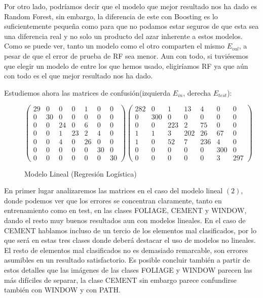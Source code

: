 \documentclass{article}
\begin{document}
	\par
	Por otro lado, podríamos decir que el modelo que mejor resultado nos ha dado es Random Forest, sin embargo, la diferencia de este con Boosting es lo suficientemente pequeña como para que no podamos estar seguros de que esta sea una diferencia real y no solo un producto del azar inherente a estos modelos. Como se puede ver, tanto un modelo como el otro comparten el mismo $E_{val}$, a pesar de que el error de prueba de RF sea menor. Aun con todo, si tuviésemos que elegir un modelo de entre los que hemos usado, eligiríamos RF ya que aún con todo es el que mejor resultado nos ha dado.
	\par
	Estudiemos ahora las matrices de confusión(izquierda $E_{in}$, derecha ${E_{test}}$):
	
	\begin{figure}[H]
	\begin{equation}
		\begin{pmatrix}
			29 & 0 & 0 & 0 & 1 & 0 & 0\\
			0 & 30 & 0 & 0 & 0 & 0 & 0\\
			0 & 0 & 24 & 0 & 6 & 0 & 0\\
			0 & 0 & 1 & 23 & 2 & 4 & 0\\
			0 & 0 & 4 & 0 & 26 & 0 & 0\\
			0 & 0 & 0 & 0 & 0 & 30 & 0\\
			0 & 0 & 0 & 0 & 0 & 0 & 30
		\end{pmatrix}
		\begin{pmatrix}
		282 & 0 & 1 & 13 & 4 & 0 & 0\\
		0 & 300 & 0 & 0 & 0 & 0 & 0\\
		0 & 0 & 223 & 2 & 75 & 0 & 0\\
		1 & 1 & 3 & 202 & 26 & 67 & 0\\
		1 & 0 & 52 & 7 & 236 & 4 & 0\\
		0 & 0 & 0 & 0 & 0 & 300 & 0\\
		0 & 0 & 0 & 0 & 0 & 3 & 297
		\end{pmatrix}
	\end{equation}
	\caption{Modelo Lineal (Regresión Logística)}
	\end{figure}
		En primer lugar analizaremos las matrices en el caso del modelo lineal $(2)$, donde podemos ver que los errores se concentran claramente, tanto en entrenamiento como en test, en las clases FOLIAGE, CEMENT y WINDOW, dando el resto muy buenos resultados aun con modelos lineales. En el caso de CEMENT hablamos incluso de un tercio de los elementos mal clasificados, por lo que será en estas tres clases donde deberá destacar el uso de modelos no lineales. El resto de elementos mal clasificados no es demasiado remarcable, son errores asumibles en un resultado satisfactorio. Es posible concluir también a partir de estos detalles que las imágenes de las clases FOLIAGE y WINDOW parecen las más difíciles de separar, la clase CEMENT sin embargo parece confundirse también con WINDOW y con PATH.
\end{document}
